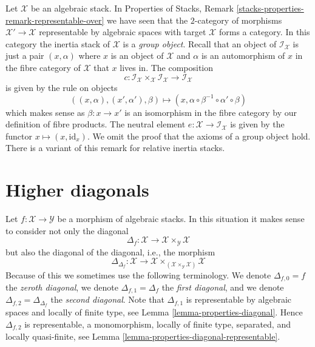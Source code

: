 \begin{remark}
\label{remark-inertia-is-group-in-spaces}
Let $\mathcal{X}$ be an algebraic stack. In
Properties of Stacks, Remark \ref{stacks-properties-remark-representable-over}
we have seen that the $2$-category of morphisms
$\mathcal{X}' \to \mathcal{X}$ representable by algebraic spaces
with target $\mathcal{X}$ forms a category.
In this category the inertia stack of $\mathcal{X}$ is
a {\it group object}. Recall that an object of $\mathcal{I}_{\mathcal{X}}$
is just a pair $(x, \alpha)$ where $x$ is an object of $\mathcal{X}$
and $\alpha$ is an automorphism of $x$ in the fibre category of $\mathcal{X}$
that $x$ lives in. The composition
$$
c :
\mathcal{I}_{\mathcal{X}} \times_{\mathcal{X}} \mathcal{I}_{\mathcal{X}}
\longrightarrow
\mathcal{I}_{\mathcal{X}}
$$
is given by the rule on objects
$$
((x, \alpha), (x', \alpha'), \beta) \mapsto
(x, \alpha \circ \beta^{-1} \circ \alpha' \circ \beta)
$$
which makes sense as $\beta : x \to x'$ is an isomorphism in the fibre
category by our definition of fibre products. The neutral element
$e : \mathcal{X} \to \mathcal{I}_{\mathcal{X}}$ is given by the
functor $x \mapsto (x, \text{id}_x)$. We omit the proof that the
axioms of a group object hold.
There is a variant of this remark for relative inertia stacks.
\end{remark}









\section{Higher diagonals}
\label{section-higher-diagonals}

\noindent
Let $f : \mathcal{X} \to \mathcal{Y}$ be a morphism of algebraic stacks.
In this situation it makes sense to consider not only the diagonal
$$
\Delta_f : \mathcal{X} \to \mathcal{X} \times_{\mathcal{Y}} \mathcal{X}
$$
but also the diagonal of the diagonal, i.e., the morphism
$$
\Delta_{\Delta_f} :
\mathcal{X}
\longrightarrow
\mathcal{X} \times_{(\mathcal{X} \times_{\mathcal{Y}} \mathcal{X})} \mathcal{X}
$$
Because of this we sometimes use the following terminology. We denote
$\Delta_{f, 0} = f$ the {\it zeroth diagonal},
we denote $\Delta_{f, 1} = \Delta_f$ the {\it first diagonal}, and
we denote $\Delta_{f, 2} = \Delta_{\Delta_f}$ the {\it second diagonal}.
Note that $\Delta_{f, 1}$ is representable by algebraic spaces and locally of
finite type, see
Lemma \ref{lemma-properties-diagonal}.
Hence $\Delta_{f, 2}$ is representable, a monomorphism, locally of finite type,
separated, and locally quasi-finite, see
Lemma \ref{lemma-properties-diagonal-representable}.

